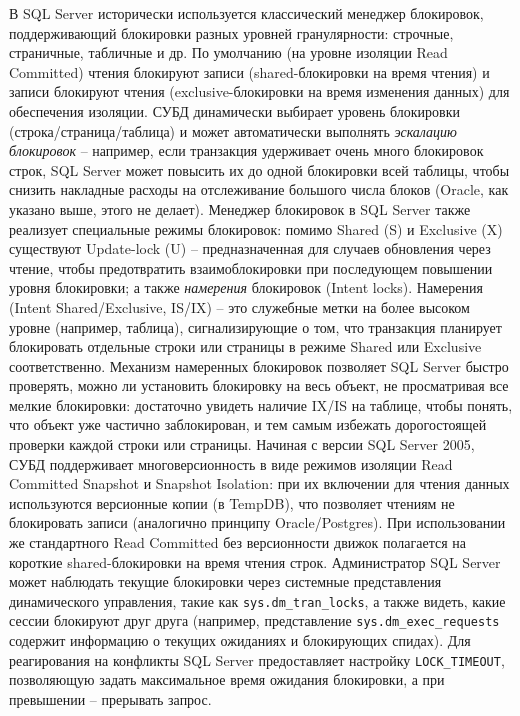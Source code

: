 \begin{itemize}
    В SQL Server исторически используется классический менеджер блокировок, поддерживающий блокировки разных уровней гранулярности: строчные, страничные, табличные и др. По умолчанию (на уровне изоляции Read Committed) чтения блокируют записи (shared-блокировки на время чтения) и записи блокируют чтения (exclusive-блокировки на время изменения данных) для обеспечения изоляции. СУБД динамически выбирает уровень блокировки (строка/страница/таблица) и может автоматически выполнять \textit{эскалацию блокировок} – например, если транзакция удерживает очень много блокировок строк, SQL Server может повысить их до одной блокировки всей таблицы, чтобы снизить накладные расходы на отслеживание большого числа блоков (Oracle, как указано выше, этого не делает). Менеджер блокировок в SQL Server также реализует специальные режимы блокировок: помимо Shared (S) и Exclusive (X) существуют Update-lock (U) – предназначенная для случаев обновления через чтение, чтобы предотвратить взаимоблокировки при последующем повышении уровня блокировки; а также \textit{намерения} блокировок (Intent locks). Намерения (Intent Shared/Exclusive, IS/IX) – это служебные метки на более высоком уровне (например, таблица), сигнализирующие о том, что транзакция планирует блокировать отдельные строки или страницы в режиме Shared или Exclusive соответственно. Механизм намеренных блокировок позволяет SQL Server быстро проверять, можно ли установить блокировку на весь объект, не просматривая все мелкие блокировки: достаточно увидеть наличие IX/IS на таблице, чтобы понять, что объект уже частично заблокирован, и тем самым избежать дорогостоящей проверки каждой строки или страницы. Начиная с версии SQL Server 2005, СУБД поддерживает многоверсионность в виде режимов изоляции Read Committed Snapshot и Snapshot Isolation: при их включении для чтения данных используются версионные копии (в TempDB), что позволяет чтениям не блокировать записи (аналогично принципу Oracle/Postgres). При использовании же стандартного Read Committed без версионности движок полагается на короткие shared-блокировки на время чтения строк. Администратор SQL Server может наблюдать текущие блокировки через системные представления динамического управления, такие как \texttt{sys.dm\_tran\_locks}, а также видеть, какие сессии блокируют друг друга (например, представление \texttt{sys.dm\_exec\_requests} содержит информацию о текущих ожиданиях и блокирующих спидах). Для реагирования на конфликты SQL Server предоставляет настройку \texttt{LOCK\_TIMEOUT}, позволяющую задать максимальное время ожидания блокировки, а при превышении – прерывать запрос.

\end{itemize}
